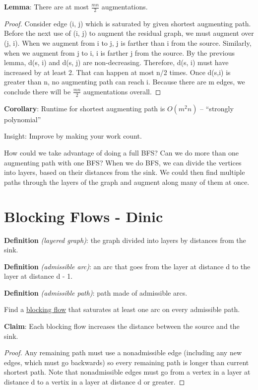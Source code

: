 \documentclass{article}
\begin{document}
  \textbf{Lemma}:
  There are at most $\frac{mn}{2}$ augmentations.

  \begin{proof}
    Consider edge (i, j) which is saturated by given shortest augmenting path. Before the next use of (i, j) to augment the residual graph, we must augment over (j, i). When we augment from i to j, j is farther than i from the source. Similarly, when we augment from j to i, i is farther j from the source. By the previous lemma, d(s, i) and d(s, j) are non-decreasing. Therefore, d(s, i) must have increased by at least 2. That can happen at most n/2 times. Once d(s,i) is greater than n, no augmenting path can reach i. Because there are m edges, we conclude there will be $\frac{mn}{2}$ augmentations overall.
  \end{proof}

  \textbf{Corollary}:
  Runtime for shortest augmenting path is $O(m^2n)$ -- ``strongly polynomial''
  
  Insight: Improve by making your work count.

  How could we take advantage of doing a full BFS? Can we do more than one augmenting path with one BFS? When we do BFS, we can divide the vertices into layers, based on their distances from the sink. We could then find multiple paths through the layers of the graph and augment along many of them at once.
  
  \section{Blocking Flows - Dinic}
  
  \textbf{Definition} \emph{(layered graph)}:
    the graph divided into layers by distances from the sink.

  \textbf{Definition} \emph{(admissible arc)}:
    an arc that goes from the layer at distance d to the layer at distance d - 1.

  \textbf{Definition} \emph{(admissible path)}:
    path made of admissible arcs.
  
  Find a \underline{blocking flow} that saturates at least one arc on every admissible path.
  
  \textbf{Claim}:
  Each blocking flow increases the distance between the source and the sink.
  
  \begin{proof}
    Any remaining path must use a nonadmissible edge (including any new edges, which must go backwards) so every remaining path is longer than current shortest path.  Note that nonadmissible edges must go from a vertex in a layer at distance d to a vertix in a layer at distance d or greater.
  \end{proof}
  
\end{document}
